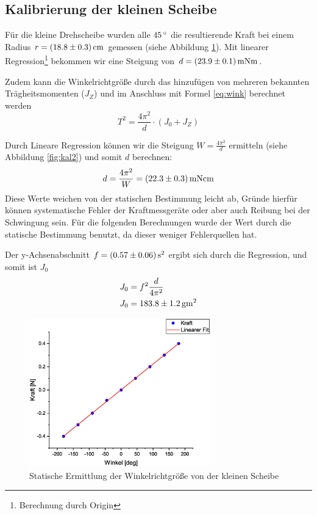 \subsection{Kalibrierung der kleinen Scheibe}
Für die kleine Drehscheibe wurden alle $\unit[45]{^\circ}$ die resultierende Kraft bei einem Radius $r = \unit[(18.8 \pm 0.3)]{cm}$ gemessen (siehe Abbildung \ref{fig:kal1}). Mit linearer Regression\footnote{Berechnung durch Origin} bekommen wir eine Steigung von $d = \unit[(23.9 \pm 0.1)]{mN m}$.

Zudem kann die Winkelrichtgröße durch das hinzufügen von mehreren bekannten Trägheitsmomenten ($J_Z$) und im Anschluss mit Formel \ref{eq:wink} berechnet werden
\begin{equation}
T^2 = \frac{4\pi^2}{d}\cdot (J_0+J_Z)
\end{equation}

Durch Lineare Regression können wir die Steigung $W = \frac{4\pi^2}{d}$ ermitteln (siehe Abbildung \ref{fig:kal2}) und somit $d$ berechnen:
\begin{equation*}
d = \frac{4\pi^2}{W} = \unit[(22.3 \pm 0.3)]{mN cm}
\end{equation*}
Diese Werte weichen von der statischen Bestimmung leicht ab, Gründe hierfür können systematische Fehler der Kraftmessgeräte oder aber auch Reibung bei der Schwingung sein. Für die folgenden Berechnungen wurde der Wert durch die statische Bestimmung benutzt, da dieser weniger Fehlerquellen hat.

Der y-Achsenabschnitt $f = \unit[(0.57 \pm 0.06)]{s^2}$ ergibt sich durch die Regression, und somit ist $J_0$
\begin{align}
J_0 &= f^2\frac{d}{4\pi^2}\\
J_0 &= \unit[183.8 \pm 1.2]{g m^2}
\end{align}


\begin{figure}
\begin{center}
\includegraphics[width=0.7\textwidth]{Bilder/kal1.eps}
\caption{Statische Ermittlung der Winkelrichtgröße von der kleinen Scheibe}
\label{fig:kal1}
\end{center}
\end{figure}


